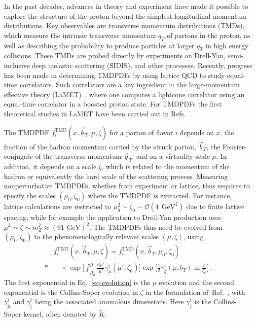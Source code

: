 \documentclass[prd,aps,twocolumn,bibnotes,nofootinbib,preprintnumbers,floatfix]{revtex4-1}
\DeclareRobustCommand{\eq}[1]{Eq.~\eqref{eq:#1}}
\DeclareRobustCommand{\mycite}[1]{Ref.~\cite{#1}}
\newcommand{\df}{\mathrm{d}}
\newcommand{\cO}{\mathcal{O}}
\newcommand{\GeV}{\,\mathrm{GeV}}
\newcommand{\nn}{\nonumber}
\newcommand{\bt}{\vec b_T}
\newcommand{\qt}{\vec q_T}
\newcommand\TMD{\mathrm{TMD}}
\begin{document}
In the past decades, advances in theory and experiment have made it possible to explore the structure of the proton beyond the simplest longitudinal momentum distributions. Key observables are transverse momentum distributions (TMDs), which measure the intrinsic transverse momentum $q_T$ of partons in the proton, as well as describing the probability to produce particles at larger $q_T$ in high energy collisions. These TMDs are probed directly by experiments on Drell-Yan, semi-inclusive deep inelastic scattering (SIDIS), and other processes.
%
Recently, progress has been made in determining TMDPDFs by using lattice QCD \cite{Hagler:2009mb,Musch:2010ka,Musch:2011er,Engelhardt:2015xja,Yoon:2016dyh,Yoon:2017qzo} to study equal-time correlators.
Such correlators are a key ingredient in the large-momentum effective theory (LaMET)~\cite{Ji:2013dva,Ji:2014gla}, where one computes a lightcone correlator using an equal-time correlator in a boosted proton state.  For TMDPDFs the first theoretical studies in LaMET have been carried out in Refs.~\cite{Ji:2014hxa,Ji:2018hvs,Ebert:2019okf}.

The TMDPDF $f_i^\TMD(x, \bt, \mu, \zeta)$ for a parton of flavor $i$  depends on $x$, the fraction of the hadron momentum carried by the struck parton, $\bt$, the Fourier-conjugate of the transverse momentum $\qt$, and on a virtuality scale $\mu$. In addition, it depends on a scale $\zeta$, which is related to the momentum of the hadron or equivalently the hard scale of the scattering process.
Measuring nonperturbative TMDPDFs, whether from experiment or lattice, thus requires to specify the scales $(\mu_0,\zeta_0)$ where the TMDPDF is extracted.
For instance, lattice calculations are restricted to $\mu_0^2 \sim \zeta_0 \sim \cO(4\:\GeV^2)$ due to finite lattice spacing,
while for example the application to Drell-Yan production uses $\mu^2 \sim \zeta \sim m_Z^2 \approx (91~\GeV)^2$.
The TMDPDFs thus need be evolved from $(\mu_0,\zeta_0)$ to the phenomenologically relevant scales $(\mu,\zeta)$,
using 
\begin{align} \label{eq:evolution}
 &f_i^\TMD(x, \bt, \mu, \zeta) = f_i^\TMD(x, \bt, \mu_0, \zeta_0)
 \nn\\*&\quad\times
 \exp\biggl[ \int_{\mu_0}^\mu \frac{\df\mu'}{\mu'} \gamma_\mu^i(\mu',\zeta_0) \biggr]
 \exp\biggl[ \frac12 \gamma_\zeta^i(\mu,b_T) \ln\frac{\zeta}{\zeta_0} \biggr]
\,.\end{align}
The first exponential in \eq{evolution} is the $\mu$ evolution and the second exponential is the Collins-Soper evolution in $\zeta$ \cite{Collins:1981uk,Collins:1981va,Collins:1984kg} in the formulation of~\mycite{Collins:1350496}, with $\gamma_\mu^i$ and $\gamma_\zeta^i$ being the associated anomalous dimensions. Here $\gamma_\zeta^i$ is the Collins-Soper kernel, often denoted by $\tilde K$.
\end{document}
